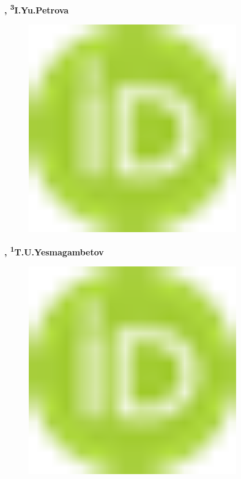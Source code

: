 {\bfseries \textsuperscript{\envelope },
\textsuperscript{3}I.Yu.Petrova}
\begin{figure}[H]
	\centering
	\includegraphics[width=0.8\textwidth]{media/ict2/image1}
	\caption*{}
\end{figure}
{\bfseries ,
\textsuperscript{1}T.U.Yesmagambetov}
\begin{figure}[H]
	\centering
	\includegraphics[width=0.8\textwidth]{media/ict2/image1}
	\caption*{}
\end{figure}



